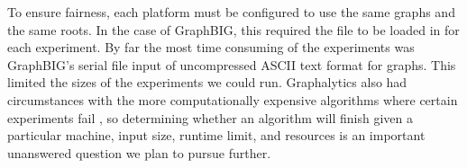 \documentclass[conference]{IEEEtran}
\begin{document}
To ensure fairness, each platform must be configured to use the same graphs and the same roots. In the case of GraphBIG, this required the file to be loaded in for each experiment. By far the most time consuming of the experiments was GraphBIG's serial file input of uncompressed ASCII text format for graphs. This limited the sizes of the experiments we could run. Graphalytics also had circumstances with the more computationally expensive algorithms  where certain experiments fail \cite{Iosup:2016:Graphalyticstech}, so determining whether an algorithm will finish given a particular machine, input size, runtime limit, and resources is an important unanswered question we plan to pursue further.



\end{document}
